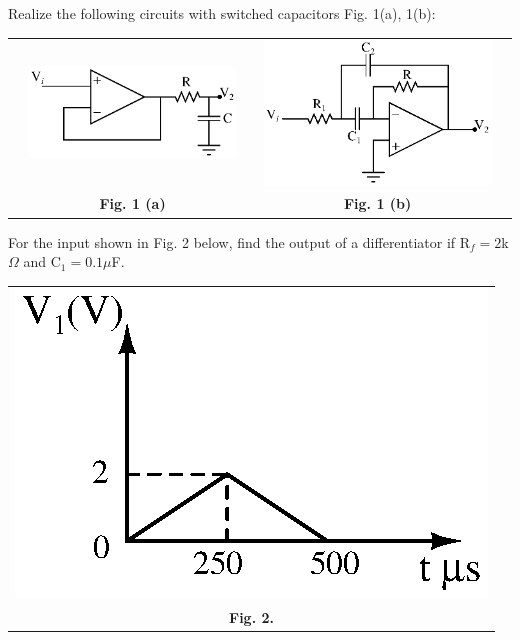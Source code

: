 \newpage \again

\item Realize the following circuits with switched capacitors Fig. 1(a), 1(b):

\begin{tabular}{c c c c c}
& \includegraphics[scale=0.8]{src/s4/ai/09_403/fig001} & & \includegraphics[scale=0.8]{src/s4/ai/09_403/fig002}\\
& \textbf{Fig. 1 (a)} &&  \textbf{Fig. 1 (b)}
\end{tabular}

\item For the input shown in Fig. 2 below, find the output of a differentiator if R$_f=2$k$\Omega$
  and C$_1=0.1\mu$F.

\begin{center}
 \begin{tabular}{c}
  \includegraphics[scale=0.8]{src/s4/ai/09_403/fig003}\\
  \textbf{Fig. 2.}
 \end{tabular}
\end{center}

